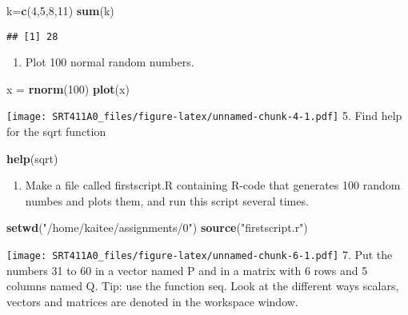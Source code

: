 \documentclass[]{article}
\newenvironment{Shaded}{\begin{snugshade}}{\end{snugshade}}
\newcommand{\KeywordTok}[1]{\textcolor[rgb]{0.13,0.29,0.53}{\textbf{#1}}}
\newcommand{\DecValTok}[1]{\textcolor[rgb]{0.00,0.00,0.81}{#1}}
\newcommand{\StringTok}[1]{\textcolor[rgb]{0.31,0.60,0.02}{#1}}
\newcommand{\NormalTok}[1]{#1}
\providecommand{\tightlist}{%
  \setlength{\itemsep}{0pt}\setlength{\parskip}{0pt}}
\begin{document}
\begin{Shaded}
\begin{Highlighting}[]
\NormalTok{k=}\KeywordTok{c}\NormalTok{(}\DecValTok{4}\NormalTok{,}\DecValTok{5}\NormalTok{,}\DecValTok{8}\NormalTok{,}\DecValTok{11}\NormalTok{) }
\KeywordTok{sum}\NormalTok{(k)}
\end{Highlighting}
\end{Shaded}

\begin{verbatim}
## [1] 28
\end{verbatim}

\begin{enumerate}
\def\labelenumi{\arabic{enumi}.}
\setcounter{enumi}{3}
\tightlist
\item
  Plot 100 normal random numbers.
\end{enumerate}

\begin{Shaded}
\begin{Highlighting}[]
\NormalTok{x =}\StringTok{ }\KeywordTok{rnorm}\NormalTok{(}\DecValTok{100}\NormalTok{)}
\KeywordTok{plot}\NormalTok{(x)}
\end{Highlighting}
\end{Shaded}

\texttt{[image: SRT411A0\_files/figure-latex/unnamed-chunk-4-1.pdf]} 5.
Find help for the sqrt function

\begin{Shaded}
\begin{Highlighting}[]
\KeywordTok{help}\NormalTok{(sqrt)}
\end{Highlighting}
\end{Shaded}

\begin{enumerate}
\def\labelenumi{\arabic{enumi}.}
\setcounter{enumi}{5}
\tightlist
\item
  Make a file called firstscript.R containing R-code that generates 100
  random numbes and plots them, and run this script several times.
\end{enumerate}

\begin{Shaded}
\begin{Highlighting}[]
\KeywordTok{setwd}\NormalTok{(}\StringTok{"/home/kaitee/assignments/0"}\NormalTok{)}
\KeywordTok{source}\NormalTok{(}\StringTok{"firstscript.r"}\NormalTok{)}
\end{Highlighting}
\end{Shaded}

\texttt{[image: SRT411A0\_files/figure-latex/unnamed-chunk-6-1.pdf]} 7.
Put the numbers 31 to 60 in a vector named P and in a matrix with 6 rows
and 5 columns named Q. Tip: use the function seq. Look at the different
ways scalars, vectors and matrices are denoted in the workspace window.
\end{document}
